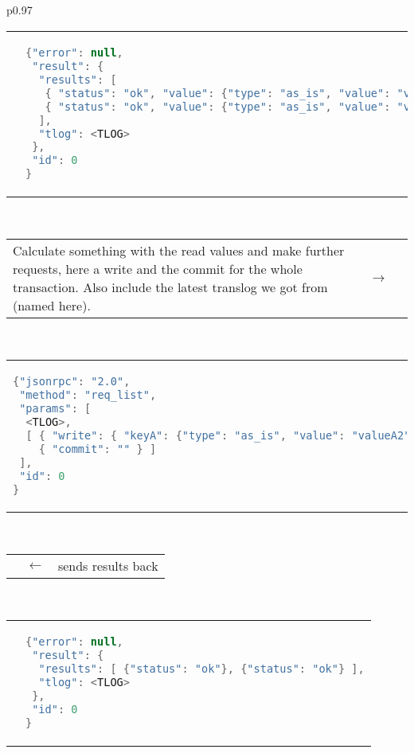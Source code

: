 \begin{longtable}{p{}}
\begin{tabular}{p{}p{}}
&
\vspace{-1.5em}%
\begin{lstlisting}[language=java]
{"error": null,
 "result": {
  "results": [
   { "status": "ok", "value": {"type": "as_is", "value": "valueA"} },
   { "status": "ok", "value": {"type": "as_is", "value": "valueB"} }
  ],
  "tlog": <TLOG>
 },
 "id": 0
}
\end{lstlisting} \\
\end{tabular} \\
%
\begin{tabular}{p{}cp{}}
Calculate something with the read values and make further requests, here a
write and the commit for the whole transaction. Also include the latest
translog we got from \scalaris{} (named \code{<TLOG>} here). & $\to$ & \\
\end{tabular}\vspace{-1.5em} \\
%
\begin{tabular}{p{}p{}}
\vspace{-1.5em}%
\begin{lstlisting}[language=java]
{"jsonrpc": "2.0",
 "method": "req_list",
 "params": [
  <TLOG>,
  [ { "write": { "keyA": {"type": "as_is", "value": "valueA2"} } },
    { "commit": "" } ]
 ],
 "id": 0
}
\end{lstlisting}
& \\
\end{tabular}\vspace{-1em} \\
%
\begin{tabular}{p{}cp{}}
 & $\leftarrow$ & \hfill{}\scalaris{} sends results back \\
\end{tabular}\vspace{-1.5em} \\

\begin{tabular}{p{}p{}}
&
\vspace{-1.5em}%
\begin{lstlisting}[language=java]
{"error": null,
 "result": {
  "results": [ {"status": "ok"}, {"status": "ok"} ],
  "tlog": <TLOG>
 },
 "id": 0
}
\end{lstlisting} \\
\end{tabular} \\
\end{longtable}

